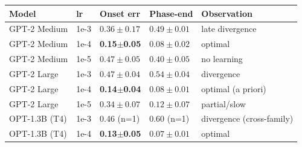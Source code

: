 \begin{tabular}{lllll}
\toprule
Model & lr & Onset err & Phase-end & Observation \\
\midrule
GPT-2 Medium & 1e-3 & $0.36{\pm}0.17$ & $0.49{\pm}0.01$ & late divergence \\
GPT-2 Medium & 1e-4 & \textbf{0.15${\pm}$0.05} & $0.08{\pm}0.02$ & optimal \\
GPT-2 Medium & 1e-5 & $0.47{\pm}0.05$ & $0.40{\pm}0.05$ & no learning \\
GPT-2 Large & 1e-3 & $0.47{\pm}0.04$ & $0.54{\pm}0.04$ & divergence \\
GPT-2 Large & 1e-4 & \textbf{0.14${\pm}$0.04} & $0.08{\pm}0.01$ & optimal (a priori) \\
GPT-2 Large & 1e-5 & $0.34{\pm}0.07$ & $0.12{\pm}0.07$ & partial/slow \\
OPT-1.3B (T4) & 1e-3 & 0.46 (n=1) & 0.60 (n=1) & divergence (cross-family) \\
OPT-1.3B (T4) & 1e-4 & \textbf{0.13${\pm}$0.05} & $0.07{\pm}0.01$ & optimal \\
\bottomrule
\end{tabular}
